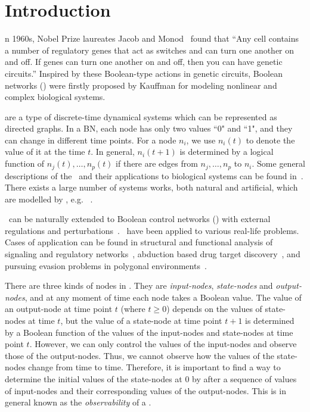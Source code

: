 

\section{Introduction}
\label{sec:intro}


n 1960s, Nobel Prize laureates Jacob and Monod~\cite{Jacob1961Genetic} found that ``Any cell contains a number of regulatory genes that act as switches and can turn one another on and off. If genes can turn one another on and off, then you can have genetic circuits.'' Inspired by these Boolean-type actions in genetic circuits, Boolean networks (\BNs) were firstly proposed by Kauffman \cite{Kauffman1968Metabolic} for modeling nonlinear and complex biological systems. 

{\BNs} are a type of discrete-time dynamical systems which can be represented as directed graphs. In a BN, each node has only two values ``0" and ``1", and they can change in different time points.  For a node $n_i$, we use $n_i(t)$ to denote the value of it at the time $t$.
In general, $n_i(t+1)$ is determined by a logical function of $n_j(t),\ldots,n_p(t)$ if  there are  edges from $n_j,\ldots,n_p$ to $n_i$.  
Some general descriptions of the \BNs\ and their applications to biological systems can be found in~\cite{Kauffman1968Metabolic}. There exists a large number of  systems works, both natural and artificial, which are modelled by \BNs, e.g. ~\cite{Akutsu2000Inferring, Shmulevich2002From, Faur2006Dynamical,Green2007The,Lou2010Multi}.
 

\BNs\ can be naturally extended to Boolean control networks (\BCNs) with external regulations and perturbations~\cite{Ideker2001A}. \BCNs\ have been applied to  various real-life problems. Cases of application can be found in 
structural and functional analysis of signaling and regulatory networks~\cite{Kaufman1999A, Klamt2006A}, 
abduction based drug target discovery~\cite{Biane2017Abduction}, 
and pursuing evasion problems in polygonal environments~\cite{Thunberg2011A}.

There are three kinds of nodes in \BCNs. They are  {\em input-nodes}, {\em state-nodes}  and {\em output-nodes}, and at  any moment of time each node takes a Boolean value.  The value of an output-node at time point $t$ (where $t\geq 0$)  depends on the values of state-nodes at time $t$, but the value of a  state-node at time point $t+1$  is determined by a  Boolean function of the values of the input-nodes and state-nodes at time point $t$. However,  we can only control the  values of the input-nodes and observe those of the output-nodes. Thus,  we cannot observe how   the values of the state-nodes change from time to time. Therefore, it is important to find a way to determine the initial values of the state-nodes at $0$ by  after a sequence of  values of  input-nodes and their corresponding  values of the output-nodes. This is in general known as the {\em observability} of a \BCN.



